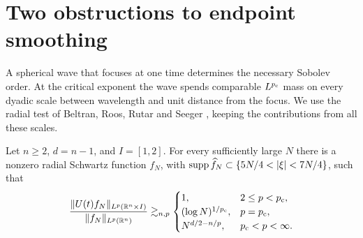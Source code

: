\section{Two obstructions to endpoint smoothing}\label{sec:sharpness}

A spherical wave that focuses at one time determines the necessary
Sobolev order. At the critical exponent the wave spends comparable
$L^{p_{\mathrm c}}$ mass on every dyadic scale between wavelength and unit
distance from the focus. We use the radial test of Beltran, Roos, Rutar
and Seeger \cite[Section~3]{BRRS2025}, keeping the contributions from
all these scales.

\begin{proposition}\label{prop:sharpness}
Let $n\ge2$, $d=n-1$, and $I=[1,2]$. For every sufficiently large $N$
there is a nonzero radial Schwartz function $f_N$, with
$\supp\widehat f_N\subset\{5N/4<|\xi|<7N/4\}$, such that
\begin{equation}\label{eq:sharp-strong}
 \frac{\|U(t)f_N\|_{L^p(\mathbb R^n\times I)}}{\|f_N\|_{L^p(\mathbb R^n)}}
 \gtrsim_{n,p}
 \begin{cases}
     1,&2\le p<p_{\mathrm c},\\
     (\log N)^{1/p_{\mathrm c}},&p=p_{\mathrm c},\\
     N^{d/2-n/p},&p_{\mathrm c}<p<\infty .
 \end{cases}
\end{equation}
\end{proposition}

